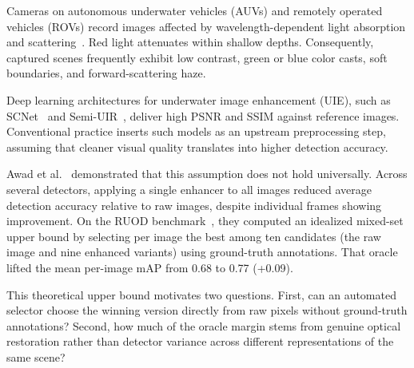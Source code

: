\documentclass[runningheads]{llncs}
\begin{document}
Cameras on autonomous underwater vehicles (AUVs) and remotely operated vehicles (ROVs) record images affected by wavelength-dependent light absorption and scattering~\cite{fuRethinkingGeneralUnderwater2023,liUnderwaterImageEnhancement2019}. Red light attenuates within shallow depths. Consequently, captured scenes frequently exhibit low contrast, green or blue color casts, soft boundaries, and forward-scattering haze.

Deep learning architectures for underwater image enhancement (UIE), such as SCNet~\cite{fuUnderwaterImageEnhancement2022} and Semi-UIR~\cite{huangContrastiveSemisupervisedLearning2023}, deliver high PSNR and SSIM against reference images. Conventional practice inserts such models as an upstream preprocessing step, assuming that cleaner visual quality translates into higher detection accuracy.

Awad et al.~\cite{awadRevisitingUnderwaterImage2026} demonstrated that this assumption does not hold universally. Across several detectors, applying a single enhancer to all images reduced average detection accuracy relative to raw images, despite individual frames showing improvement. On the RUOD benchmark~\cite{fuRethinkingGeneralUnderwater2023}, they computed an idealized mixed-set upper bound by selecting per image the best among ten candidates (the raw image and nine enhanced variants) using ground-truth annotations. That oracle lifted the mean per-image mAP from 0.68 to 0.77 (+0.09).

This theoretical upper bound motivates two questions. First, can an automated selector choose the winning version directly from raw pixels without ground-truth annotations? Second, how much of the oracle margin stems from genuine optical restoration rather than detector variance across different representations of the same scene?
\end{document}
